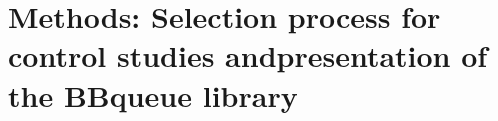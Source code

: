 \documentclass[nomenclature, english, bibtex]{kththesis}
\newcommand*{\generalExpl}[1]{\todo[inline]{#1}}
\newcommand*{\sweExpl}[1]{\todo[inline, backgroundcolor=kth-lightblue40]{#1}}  %
\begin{document}
\chapter[Methods: Control studies and BBqueue]{Methods: Selection process for control studies and\linebreak[4] presentation of the BBqueue library}
\label{ch:methods}

\end{document}
